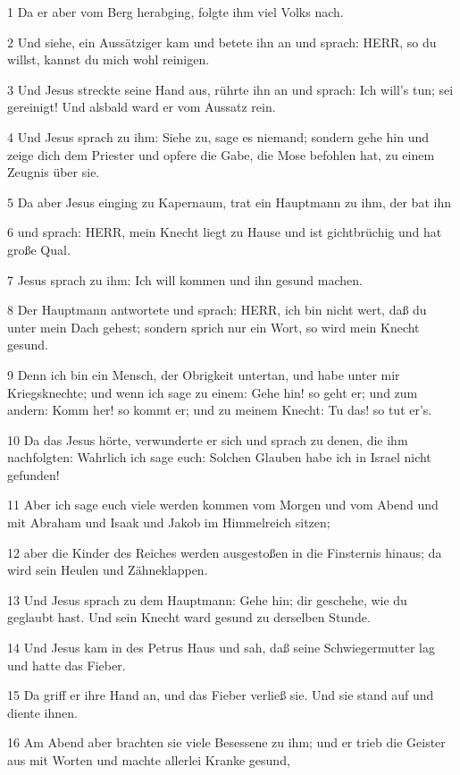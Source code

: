 \par 1 Da er aber vom Berg herabging, folgte ihm viel Volks nach.
\par 2 Und siehe, ein Aussätziger kam und betete ihn an und sprach: HERR, so du willst, kannst du mich wohl reinigen.
\par 3 Und Jesus streckte seine Hand aus, rührte ihn an und sprach: Ich will's tun; sei gereinigt! Und alsbald ward er vom Aussatz rein.
\par 4 Und Jesus sprach zu ihm: Siehe zu, sage es niemand; sondern gehe hin und zeige dich dem Priester und opfere die Gabe, die Mose befohlen hat, zu einem Zeugnis über sie.
\par 5 Da aber Jesus einging zu Kapernaum, trat ein Hauptmann zu ihm, der bat ihn
\par 6 und sprach: HERR, mein Knecht liegt zu Hause und ist gichtbrüchig und hat große Qual.
\par 7 Jesus sprach zu ihm: Ich will kommen und ihn gesund machen.
\par 8 Der Hauptmann antwortete und sprach: HERR, ich bin nicht wert, daß du unter mein Dach gehest; sondern sprich nur ein Wort, so wird mein Knecht gesund.
\par 9 Denn ich bin ein Mensch, der Obrigkeit untertan, und habe unter mir Kriegsknechte; und wenn ich sage zu einem: Gehe hin! so geht er; und zum andern: Komm her! so kommt er; und zu meinem Knecht: Tu das! so tut er's.
\par 10 Da das Jesus hörte, verwunderte er sich und sprach zu denen, die ihm nachfolgten: Wahrlich ich sage euch: Solchen Glauben habe ich in Israel nicht gefunden!
\par 11 Aber ich sage euch viele werden kommen vom Morgen und vom Abend und mit Abraham und Isaak und Jakob im Himmelreich sitzen;
\par 12 aber die Kinder des Reiches werden ausgestoßen in die Finsternis hinaus; da wird sein Heulen und Zähneklappen.
\par 13 Und Jesus sprach zu dem Hauptmann: Gehe hin; dir geschehe, wie du geglaubt hast. Und sein Knecht ward gesund zu derselben Stunde.
\par 14 Und Jesus kam in des Petrus Haus und sah, daß seine Schwiegermutter lag und hatte das Fieber.
\par 15 Da griff er ihre Hand an, und das Fieber verließ sie. Und sie stand auf und diente ihnen.
\par 16 Am Abend aber brachten sie viele Besessene zu ihm; und er trieb die Geister aus mit Worten und machte allerlei Kranke gesund,
